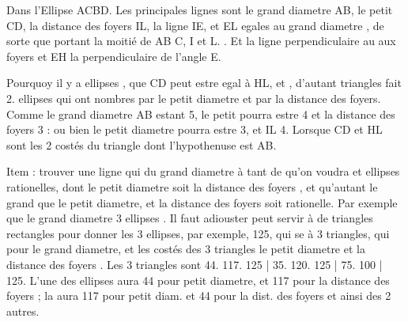 \documentclass[11pt,a4paper]{article}
\begin{document}

Dans l'Ellipse ACBD. Les principales lignes sont le grand diametre AB, le petit CD, la distance des foyers IL, la ligne IE, et EL \ill{} \ill{} egales au grand diametre \ill{}, de sorte que portant la moitié de AB \ill{} \ill{} \ill{}  C, \ill{} \ill{} \ill{} I et L.  . Et la ligne perpendiculaire au \ill{} aux foyers et EH la perpendiculaire de l'angle E.

Pourquoy il y a \ill{} ellipses \ill{},  que CD peut estre egal à HL, et \ill{} \ill{}, d'autant \ill{} triangles \ill{} fait 2. ellipses qui ont \ill{} \ill{} nombres  \ill{} par le petit diametre et par la distance des foyers. Comme le grand diametre AB estant 5, le petit pourra estre 4 et la distance des foyers 3 : ou bien le petit diametre pourra estre 3, et IL 4. Lorsque CD et HL sont les 2 costés du triangle dont l'hypothenuse est AB.

Item : trouver une ligne qui \ill{} du grand diametre à tant de \ill{} qu'on voudra et \ill{} \ill{} ellipses rationelles, dont le petit diametre soit \ill{} la distance des foyers \ill{}, et qu'autant le grand que le petit diametre, et la distance des foyers soit rationelle. Par exemple que le grand diametre \ill{} 3 ellipses \ill{}. Il faut adiouster \ill{} \ill{} \ill{} \ill{} \ill{} \ill{} \ill{} \ill{} peut servir à \ill{} \ill{} de triangles rectangles pour donner les 3 ellipses, par exemple, 125, qui se \ill{} à 3 triangles, qui \ill{} pour le grand diametre, et les costés des 3 triangles \struck{\ill{}} \ill{} le petit diametre et la distance des foyers \ill{}. Les 3 triangles sont 44. 117. 125 | 35. 120. 125 | 75. 100 | 125. L'une des ellipses aura 44 pour petit diametre, et 117 pour la distance des foyers ; la  aura 117 pour petit diam. et 44 pour la dist. des foyers et ainsi des 2 autres.
\end{document}
